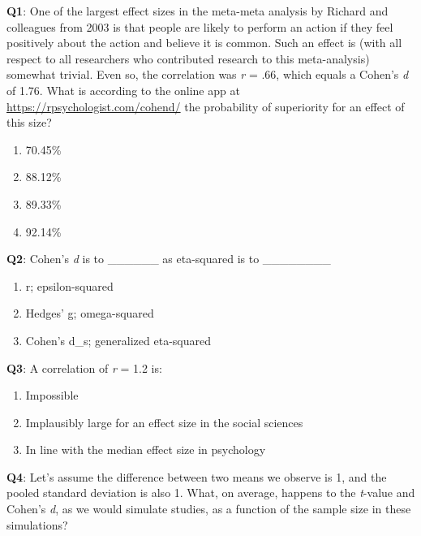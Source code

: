 \documentclass[
]{krantz}
\providecommand{\tightlist}{%
  \setlength{\itemsep}{0pt}\setlength{\parskip}{0pt}}
\begin{document}
\textbf{Q1}: One of the largest effect sizes in the meta-meta analysis by Richard and colleagues from 2003 is that people are likely to perform an action if they feel positively about the action and believe it is common. Such an effect is (with all respect to all researchers who contributed research to this meta-analysis) somewhat trivial. Even so, the correlation was \emph{r} = .66, which equals a Cohen's \emph{d} of 1.76. What is according to the online app at \url{https://rpsychologist.com/cohend/} the probability of superiority for an effect of this size?

\begin{enumerate}
\def\labelenumi{\Alph{enumi})}
\tightlist
\item
  70.45\%
\item
  88.12\%
\item
  89.33\%
\item
  92.14\%
\end{enumerate}

\textbf{Q2}: Cohen's \emph{d} is to \_\_\_\_\_\_ as eta-squared is to \_\_\_\_\_\_\_\_

\begin{enumerate}
\def\labelenumi{\Alph{enumi})}
\tightlist
\item
  r; epsilon-squared
\item
  Hedges' g; omega-squared
\item
  Cohen's d\_s; generalized eta-squared
\end{enumerate}

\textbf{Q3}: A correlation of \emph{r} = 1.2 is:

\begin{enumerate}
\def\labelenumi{\Alph{enumi})}
\tightlist
\item
  Impossible
\item
  Implausibly large for an effect size in the social sciences
\item
  In line with the median effect size in psychology
\end{enumerate}

\textbf{Q4}: Let's assume the difference between two means we observe is 1, and the pooled standard deviation is also 1. What, on average, happens to the \emph{t}-value and Cohen's \emph{d}, as we would simulate studies, as a function of the sample size in these simulations?
\end{document}
